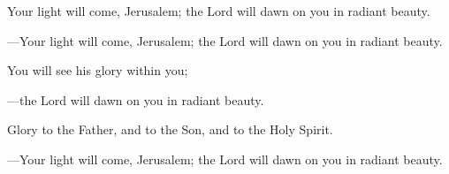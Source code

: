 \responsory

\begin{hangpar}


Your light will come, Jerusalem;
the Lord will dawn on you in radiant beauty.

{\color{red}---\thinspace }Your light will come, Jerusalem;
the Lord will dawn on you in radiant beauty.

\medskip You will see his glory within you;

{\color{red}---\thinspace }the Lord will dawn on you in radiant beauty.

\medskip Glory to the Father, and to the Son, and to the Holy Spirit.

{\color{red}---\thinspace }Your light will come, Jerusalem;
the Lord will dawn on you in radiant beauty.
\end{hangpar}